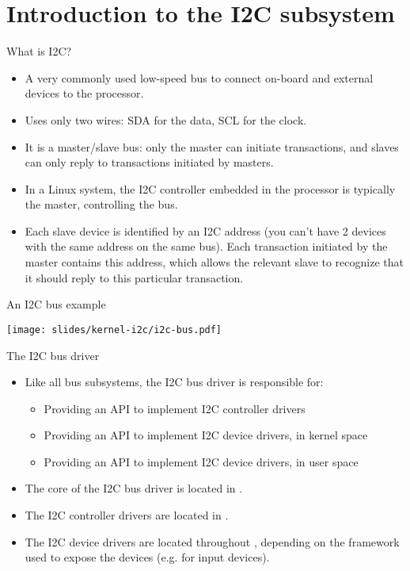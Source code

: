 \section{Introduction to the I2C subsystem}

\begin{frame}{What is I2C?}
  \begin{itemize}
  \item A very commonly used low-speed bus to connect on-board
    and external devices to the processor.
  \item Uses only two wires: SDA for the data, SCL for the clock.
  \item It is a master/slave bus: only the master can initiate
    transactions, and slaves can only reply to transactions initiated
    by masters.
  \item In a Linux system, the I2C controller embedded in the
    processor is typically the master, controlling the bus.
  \item Each slave device is identified by an I2C address (you can't
    have 2 devices with the same address on the same bus). Each transaction
    initiated by the master contains this address, which
    allows the relevant slave to recognize that it should reply to
    this particular transaction.
  \end{itemize}
\end{frame}

\begin{frame}{An I2C bus example}
  \begin{center}
    \texttt{[image: slides/kernel-i2c/i2c-bus.pdf]}
  \end{center}
\end{frame}

\begin{frame}{The I2C bus driver}
  \begin{itemize}
  \item Like all bus subsystems, the I2C bus driver is responsible for:
    \begin{itemize}
    \item Providing an API to implement I2C controller drivers
    \item Providing an API to implement I2C device drivers, in kernel space
    \item Providing an API to implement I2C device drivers, in user space
    \end{itemize}
  \item The core of the I2C bus driver is located in
    .
  \item The I2C controller drivers are located in
    .
  \item The I2C device drivers are located throughout
    , depending on the framework used to expose the
         devices (e.g.  for input devices).
  \end{itemize}
\end{frame}

